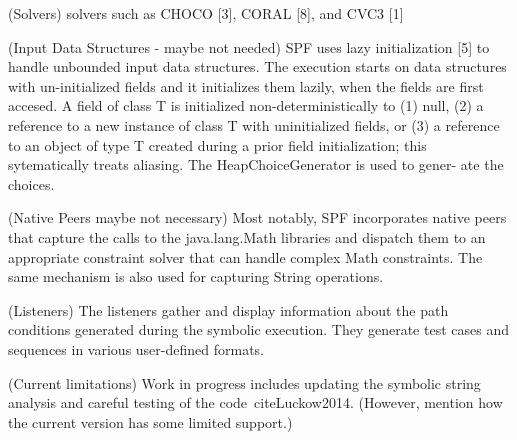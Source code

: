 (Solvers) solvers such as CHOCO [3], CORAL [8], and CVC3 [1]~\cite{Luckow2014}

(Input Data Structures - maybe not needed) SPF uses lazy initialization [5] to handle unbounded input data structures. The execution starts on data structures with un-initialized fields and it initializes them lazily, when the fields are first accesed. A field of class T is initialized non-deterministically to (1) null, (2) a reference to a new instance of class T with uninitialized fields, or (3) a reference to an object of type T created during a prior field initialization; this sytematically treats aliasing. The HeapChoiceGenerator is used to gener- ate the choices.~\cite{Pasareanu2010}

(Native Peers maybe not necessary) Most notably, SPF incorporates native peers that capture the calls to the java.lang.Math libraries and dispatch them to an appropriate constraint solver that can handle complex Math constraints. The same mechanism is also used for capturing String operations.~\cite{Pasareanu2010}

(Listeners) The listeners gather and display information about the path conditions generated during the symbolic execution. They generate test cases and sequences in various user-defined formats.~\cite{Pasareanu2010}

(Current limitations) Work in progress includes updating the symbolic string analysis and careful testing of the code~cite{Luckow2014}. (However, mention how the current version has some limited support.)







